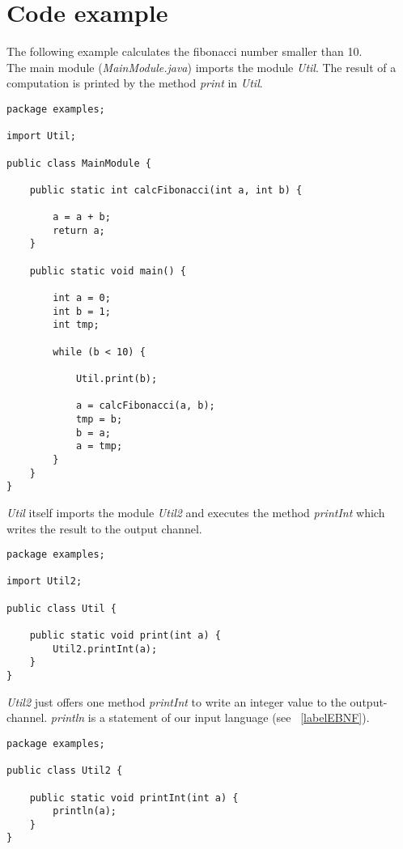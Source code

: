\section{Code example}
The following example calculates the fibonacci number smaller than 10. \\
The main module (\emph{MainModule.java}) imports the module \emph{Util}. The
result of a computation is printed by the method \emph{print} in \emph{Util}. 

\begin{lstlisting}[caption="MainModule.java"]
package examples;

import Util;

public class MainModule {

	public static int calcFibonacci(int a, int b) {
		
		a = a + b;
		return a;
	}
	
	public static void main() {
	
		int a = 0;
		int b = 1;
		int tmp;
		
		while (b < 10) {
			
			Util.print(b);
			
			a = calcFibonacci(a, b);
			tmp = b;
			b = a; 
			a = tmp;	
		}	
	}	
}
\end{lstlisting}

\emph{Util} itself imports the module \emph{Util2} and executes the method
\emph{printInt} which writes the result to the output channel.
\begin{lstlisting}[caption="Util.java"]
package examples;

import Util2;

public class Util {
	
	public static void print(int a) {
		Util2.printInt(a);
	}
}
\end{lstlisting}

\emph{Util2} just offers one method \emph{printInt} to write an integer value to
the output-channel. \emph{println} is a statement of our input language (see
~\ref{labelEBNF}).

\begin{lstlisting}[caption="Util2.java"]
package examples;

public class Util2 {

	public static void printInt(int a) {
		println(a);
	}
}
\end{lstlisting}
